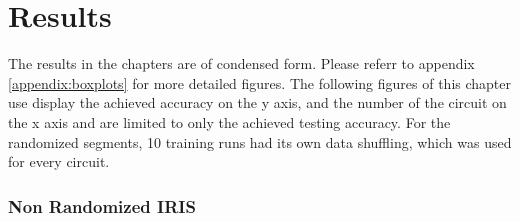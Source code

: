 
\chapter{Results} %

\label{chapter:results}

The results in the chapters are of condensed form. Please referr to appendix \ref{appendix:boxplots} for more detailed figures. The following figures of this chapter use display the achieved accuracy on the y axis, and the number of the circuit on the x axis and are limited to only the achieved testing accuracy. For the randomized segments, 10 training runs had its own data shuffling, which was used for every circuit.
\def \newboxplotwidth {230pt}


\subsection{Non Randomized IRIS}
\label{chapter:iris_non_randomized}


